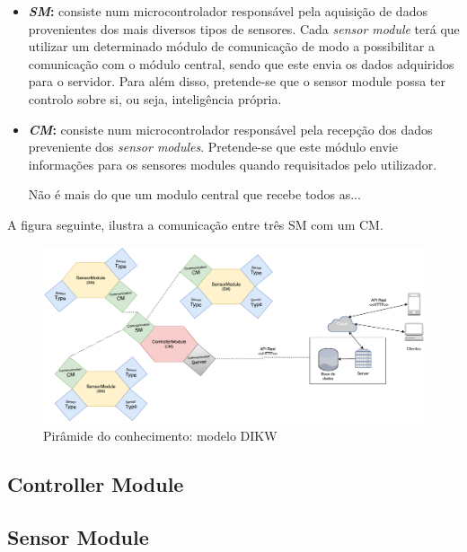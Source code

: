 \begin{itemize}
	\item \textbf{\textit{\ac{SM}}:} consiste num microcontrolador responsável pela aquisição de dados provenientes dos mais diversos tipos de sensores. Cada \textit{sensor module} terá que utilizar um determinado módulo de comunicação de modo a possibilitar a comunicação com o módulo central, sendo que este envia os dados adquiridos para o servidor. Para além disso, pretende-se que o sensor module possa ter controlo sobre si, ou seja, inteligência própria.  
	 
	\item \textbf{\textit{\ac{CM}}:} consiste num microcontrolador responsável pela recepção dos dados preveniente dos \textit{sensor modules}. Pretende-se que este módulo envie informações para os sensores modules quando requisitados pelo utilizador. 
	
	
	Não é mais do que um modulo central que recebe todos as...
\end{itemize}




A figura seguinte, ilustra a comunicação entre três \ac{SM} com um \ac{CM}. 


\begin{figure}[h]
	\centering
	\includegraphics[scale=0.35]{esquemas/general-electronic-modules.pdf}
	\caption{Pirâmide do conhecimento: modelo DIKW}
	\label{dikw}
\end{figure}




\subsection{Controller Module}


\subsection{Sensor Module}









